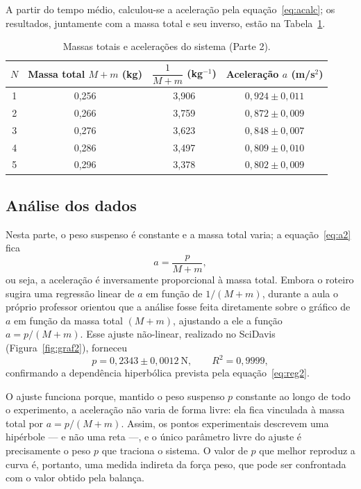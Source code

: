 \documentclass[12pt,a4paper]{article}
\begin{document}
A partir do tempo médio, calculou-se a aceleração pela equação~\eqref{eq:acalc}; os resultados,
juntamente com a massa total e seu inverso, estão na Tabela~\ref{tab:acel2}.

\begin{table}[!h]
	\centering
	\begin{tabular}{|c|c|c|c|} \hline \hline
	$N$ & Massa total $M+m$ (kg) & $\dfrac{1}{M+m}$ (kg$^{-1}$) & Aceleração $a$ (m/s$^2$) \\ \hline \hline
	1 & 0,256 & 3,906 & $0{,}924 \pm 0{,}011$ \\ \hline
	2 & 0,266 & 3,759 & $0{,}872 \pm 0{,}009$ \\ \hline
	3 & 0,276 & 3,623 & $0{,}848 \pm 0{,}007$ \\ \hline
	4 & 0,286 & 3,497 & $0{,}809 \pm 0{,}010$ \\ \hline
	5 & 0,296 & 3,378 & $0{,}802 \pm 0{,}009$ \\ \hline \hline
	\end{tabular}
	\caption{Massas totais e acelerações do sistema (Parte 2).}
	\label{tab:acel2}
\end{table}

\subsection{Análise dos dados}
Nesta parte, o peso suspenso é constante e a massa total varia; a equação~\eqref{eq:a2} fica
\begin{equation}
\label{eq:reg2}
a = \frac{p}{M+m},
\end{equation}
ou seja, a aceleração é inversamente proporcional à massa total. Embora o roteiro sugira uma
regressão linear de $a$ em função de $1/(M+m)$, durante a aula o próprio professor orientou que a
análise fosse feita diretamente sobre o gráfico de $a$ em função da massa total $(M+m)$, ajustando
a ele a função $a = p/(M+m)$. Esse ajuste não-linear, realizado no SciDavis
(Figura~\ref{fig:graf2}), forneceu
\[
p = 0{,}2343 \pm 0{,}0012~\mathrm{N}, \qquad R^2 = 0{,}9999,
\]
confirmando a dependência hiperbólica prevista pela equação~\eqref{eq:reg2}.

O ajuste funciona porque, mantido o peso suspenso $p$ constante ao longo de todo o experimento, a
aceleração não varia de forma livre: ela fica vinculada à massa total por $a = p/(M+m)$. Assim, os
pontos experimentais descrevem uma hipérbole --- e não uma reta ---, e o único parâmetro livre do
ajuste é precisamente o peso $p$ que traciona o sistema. O valor de $p$ que melhor reproduz a curva
é, portanto, uma medida indireta da força peso, que pode ser confrontada com o valor obtido pela
balança.
\end{document}
